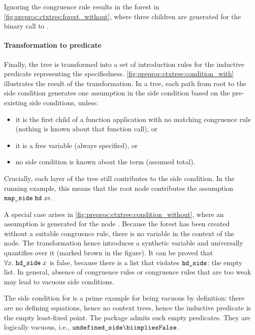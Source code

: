 \noindent
Ignoring the congruence rule results in the forest in \cref{fig:preproc:ctxtree:forest_without}, where three children are generated for the binary call to .

\paragraph{Transformation to predicate}
Finally, the tree is transformed into a set of introduction rules for the inductive predicate representing the specifiedness.
\cref{fig:preproc:ctxtree:condition_with} illustrates the result of the transformation.
In a tree, each path from root to the side condition generates one assumption in the side condition based on the pre-existing side conditions, unless:
\begin{itemize}
  \item it is the first child of a function application with no matching congruence rule (nothing is known about that function call), or
  \item it is a free variable (always specified), or
  \item no side condition is known about the term (assumed total).
\end{itemize}

\noindent
Crucially, each layer of the tree still contributes to the side condition.
In the running example, this means that the root node contributes the assumption $\texttt{\textup{map\_side}}\;\texttt{\textup{hd}}\;\mathit{xs}$.

A special case arises in \cref{fig:preproc:ctxtree:condition_without}, where an assumption is generated for the node .
Because the forest has been created without a suitable congruence rule, there is no variable in the context of the node.
The transformation hence introduces a synthetic variable and universally quantifies over it (marked brown in the figure).
It can be proved that $\forall x.\;\texttt{\textup{hd\_side}}\;x$ is false, because there is a list that violates $\texttt{\textup{hd\_side}}$: the empty list.
In general, absence of congruence rules or congruence rules that are too weak may lead to vacuous side conditions.

The side condition for  is a prime example for being vacuous by definition:
there are no defining equations, hence no context trees, hence the inductive predicate is the empty least-fixed point.
The  package admits such empty predicates.
They are logically vacuous, i.e., $\holconst{undefined\_side} \biimplies \holconst{False}$.

